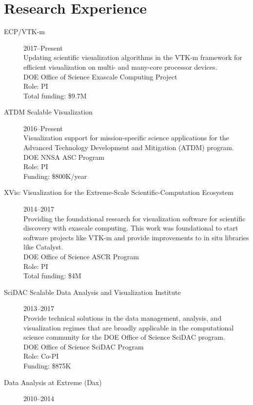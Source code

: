 \documentclass{article}
\begin{document}
\section*{Research Experience}

\begin{description}
\item[ECP/VTK-m]\hfill 2017--Present\\
  Updating scientific visualization algorithms in the VTK-m framework for efficient visualization on multi- and many-core processor devices.\\
  DOE Office of Science Exascale Computing Project\\
  Role: PI\\
  Total funding: \$9.7M %
\item[ATDM Scalable Visualization]\hfill 2016--Present\\
  Visualization support for mission-specific science applications for the Advanced Technology Development and Mitigation (ATDM) program.\\
  DOE NNSA ASC Program\\
  Role: PI\\
  Funding: \$800K/year
\item[XVis: Visualization for the Extreme-Scale Scientific-Computation Ecosystem]\hfill 2014--2017\\
  Providing the foundational research for visualization software for scientific discovery with exascale computing. This work was foundational to start software projects like \mbox{VTK-m} and provide improvements to in situ libraries like Catalyst. \\
  DOE Office of Science ASCR Program\\
  Role: PI \\
  Total funding: \$4M
\item[SciDAC Scalable Data Analysis and Visualization Institute]\hfill 2013--2017\\
  Provide technical solutions in the data management, analysis, and
  visualization regimes that are broadly applicable in the
  computational science community for the DOE Office of Science SciDAC program.\\
  DOE Office of Science SciDAC Program\\
  Role: Co-PI\\
  Funding: \$875K
\item[Data Analysis at Extreme (Dax)]\hfill 2010--2014\\

\end{description}
\end{document}
